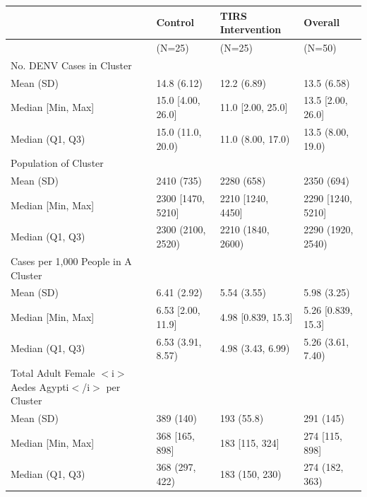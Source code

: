 \begin{table}[ht]
\centering
\begin{tabular}{llll}
  \hline
  & Control & TIRS Intervention & Overall \\ 
  \hline
 & (N=25) & (N=25) & (N=50) \\ 
  No. DENV Cases in Cluster &  &  &  \\ 
    Mean (SD) & 14.8 (6.12) & 12.2 (6.89) & 13.5 (6.58) \\ 
    Median [Min, Max] & 15.0 [4.00, 26.0] & 11.0 [2.00, 25.0] & 13.5 [2.00, 26.0] \\ 
    Median (Q1, Q3) & 15.0 (11.0, 20.0) & 11.0 (8.00, 17.0) & 13.5 (8.00, 19.0) \\ 
  Population of Cluster &  &  &  \\ 
    Mean (SD) & 2410 (735) & 2280 (658) & 2350 (694) \\ 
    Median [Min, Max] & 2300 [1470, 5210] & 2210 [1240, 4450] & 2290 [1240, 5210] \\ 
    Median (Q1, Q3) & 2300 (2100, 2520) & 2210 (1840, 2600) & 2290 (1920, 2540) \\ 
  Cases per 1,000 People in A Cluster &  &  &  \\ 
    Mean (SD) & 6.41 (2.92) & 5.54 (3.55) & 5.98 (3.25) \\ 
    Median [Min, Max] & 6.53 [2.00, 11.9] & 4.98 [0.839, 15.3] & 5.26 [0.839, 15.3] \\ 
    Median (Q1, Q3) & 6.53 (3.91, 8.57) & 4.98 (3.43, 6.99) & 5.26 (3.61, 7.40) \\ 
  Total Adult Female $<$i$>$Aedes Agypti$<$/i$>$ per Cluster &  &  &  \\ 
    Mean (SD) & 389 (140) & 193 (55.8) & 291 (145) \\ 
    Median [Min, Max] & 368 [165, 898] & 183 [115, 324] & 274 [115, 898] \\ 
    Median (Q1, Q3) & 368 (297, 422) & 183 (150, 230) & 274 (182, 363) \\ 
   \hline
\end{tabular}
\end{table}
